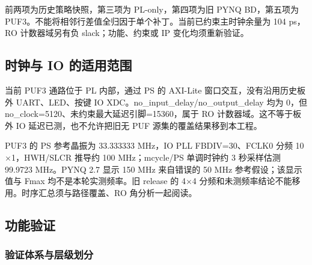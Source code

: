前两项为历史策略快照，第三项为 PL-only，第四项为旧 PYNQ BD，第五项为 PUF3。不能将相邻行差值全归因于单个补丁。当前已约束主时钟余量为 104 ps，RO 计数器域另有负 slack；功能、约束或 IP 变化均须重新验证。


\Needspace{85pt}

\subsection{时钟与 IO 的适用范围}\label{ux65f6ux949fux4e0e-io-ux7684ux9002ux7528ux8303ux56f4}

当前 PUF3 通路位于 PL 内部，通过 PS 的 AXI-Lite 窗口交互，没有沿用历史板外 UART、LED、按键 IO XDC。no\_input\_delay/no\_output\_delay 均为 0，但 no\_clock=5120、未约束最大延迟引脚=15360，属于 RO 计数器域。这不等于板外 IO 延迟已测，也不允许把旧无 PUF 源集的覆盖结果移到本工程。

PUF3 的 PS 参考晶振为 33.333333 MHz，IO PLL FBDIV=30、FCLK0 分频 10$\times$1，HWH/SLCR 推导约 100 MHz；mcycle/PS 单调时钟约 3 秒采样估测 99.9723 MHz。PYNQ 2.7 显示 150 MHz 来自错误的 50 MHz 参考假设；该显示值与 Fmax 均不是本轮实测频率。旧 release 的 4$\times$4 分频和未测频率结论不能移用。时序汇总须与路径覆盖、RO 角分析一起阅读。

\Needspace{85pt}

\subsection{功能验证}

\Needspace{150pt}

\subsubsection{验证体系与层级划分}

